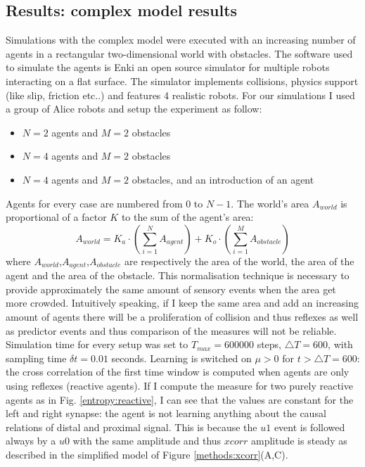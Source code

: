 \subsection{Results: complex model results}
Simulations with the complex model were executed with an increasing number of agents in a rectangular
two-dimensional world with obstacles. 
The software used to simulate the agents is Enki 
an open source simulator for multiple robots interacting on a flat surface.
The simulator implements collisions, physics support (like slip, friction etc..)
and features 4 realistic robots.
For our simulations I used a group of Alice robots and setup the experiment as follow:
\begin{itemize}
\item $N=2$ agents and  $M=2$ obstacles
\item $N=4$ agents and $M=2$ obstacles
\item $N=4$ agents and $M=2$ obstacles, and an introduction of an agent
\end{itemize}
Agents for every case are numbered from $0$ to $N-1$.
The world's area $A_{world}$ is proportional of a factor $K$ to the sum of the agent's area:
\begin{equation}
 A_{world}=K_{a} \cdot (\sum_{i=1}^{N} A_{agent} )+ K_{o} \cdot (\sum_{i=1}^{M} A_{obstacle} )
\end{equation}
where  $A_{world}$,$A_{agent}$,$A_{obstacle}$ are respectively the area of the world,
the area of the agent and the area of the obstacle.
This normalisation technique is necessary to provide approximately the same amount 
of sensory events when the area get more crowded.
Intuitively speaking, if I keep the same area and add an increasing amount of agents
there will be a proliferation of collision and thus reflexes as well as predictor
events and thus comparison of the measures will not be reliable.
Simulation time for every setup was set to $T_{max}=600000$ steps,
$\triangle T=600 $, with sampling time $\delta t=0.01$ seconds.
Learning is switched on $\mu >0$ for $t> \triangle T=600$:
the cross correlation of the first time window is
computed when agents are only using reflexes (reactive agents).
If I compute the measure for two purely reactive agents as in Fig. \ref{entropy:reactive},
I can see that the values are constant for the left and right synapse: the agent is not learning
anything about the causal relations of distal and proximal signal.
This is because the $u1$ event is followed always by a $u0$
with the same amplitude and thus $xcorr$ amplitude is steady as described in the 
simplified model of Figure \ref{methods:xcorr}(A,C).

